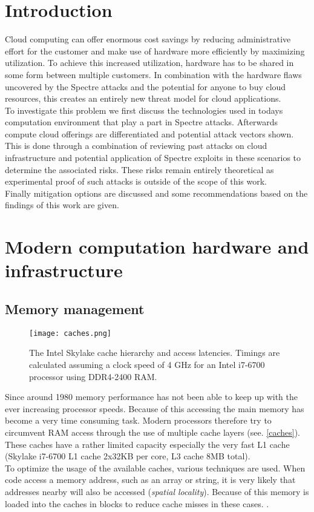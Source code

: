 \documentclass[conference,compsoc,final,a4paper]{IEEEtran}
\begin{document}
\section{Introduction}
Cloud computing can offer enormous cost savings by reducing administrative effort for the customer and make use of hardware more efficiently by maximizing utilization. To achieve this increased utilization, hardware has to be shared in some form between multiple customers. \cite{mell2011nist} In combination with the hardware flaws uncovered by the Spectre attacks and the potential for anyone to buy cloud resources, this creates an entirely new threat model for cloud applications. \\
To investigate this problem we first discuss the technologies used in todays computation environment that play a part in Spectre attacks. Afterwards compute cloud offerings are differentiated and potential attack vectors shown. This is done through a combination of reviewing past attacks on cloud infrastructure and potential application of Spectre exploits in these scenarios to determine the associated risks. These risks remain entirely theoretical as experimental proof of such attacks is outside of the scope of this work. \\
Finally mitigation options are discussed and some recommendations based on the findings of this work are given.

\section{Modern computation hardware and infrastructure}
\subsection{Memory management}
\begin{figure}[!ht]
\centering
\texttt{[image: caches.png]}
\caption{The Intel Skylake cache hierarchy and access latencies\cite{fog2012microarchitecture}. Timings are calculated assuming a clock speed of 4 GHz for an Intel i7-6700 processor using DDR4-2400 RAM\cite{skylakeBenchmark}. }
\label{caches}
\end{figure}
Since around 1980 memory performance has not been able to keep up with the ever increasing processor speeds. \cite[p.~73]{hennessy2011computer} Because of this accessing the main memory has become a very time consuming task. Modern processors therefore try to circumvent RAM access through the use of multiple cache layers (see. \autoref{caches}). These caches have a rather limited capacity especially the very fast L1 cache (Skylake i7-6700 L1 cache 2x32KB per core, L3 cache 8MB total). \cite{skylakeBenchmark} \\
To optimize the usage of the available caches, various techniques are used. When code access a memory address, such as an array or string, it is very likely that addresses nearby will also be accessed (\emph{spatial locality}). Because of this memory is loaded into the caches in blocks to reduce cache misses in these cases. \cite[p.~74]{hennessy2011computer}. \\
\end{document}
